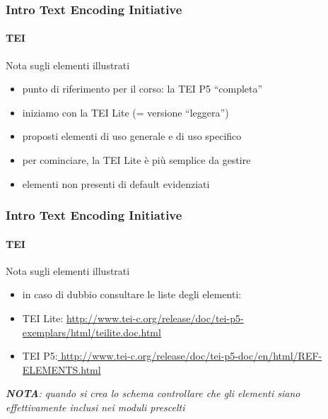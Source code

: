 \begin{frame}
	\frametitle{Intro Text Encoding Initiative}
	\framesubtitle{TEI}
	\addtocounter{nframe}{1}

	\begin{block}{Nota sugli elementi illustrati}
    \begin{itemize}
        \item punto di riferimento per il corso: la TEI P5 “completa”
        \item iniziamo con la TEI Lite (= versione “leggera”)
        \item proposti elementi di uso generale e di uso specifico
        \item per cominciare, la TEI Lite è più semplice da gestire
        \item elementi non presenti di default evidenziati 
    \end{itemize}
       
       
        
       
        
       
    \end{block}
\end{frame}

\begin{frame}
	\frametitle{Intro Text Encoding Initiative}
	\framesubtitle{TEI}
	\addtocounter{nframe}{1}

	\begin{block}{Nota sugli elementi illustrati}
        \begin{itemize}
            \item in caso di dubbio consultare le liste degli elementi:
            \item TEI Lite: \url{http://www.tei-c.org/release/doc/tei-p5-exemplars/html/teilite.doc.html}
            \item TEI P5:\url{ http://www.tei-c.org/release/doc/tei-p5-doc/en/html/REF-ELEMENTS.html}
        \end{itemize}
        
        \textit{\textbf{NOTA}: quando si crea lo schema controllare che gli elementi
        siano effettivamente inclusi nei moduli prescelti}
    \end{block}
\end{frame}


